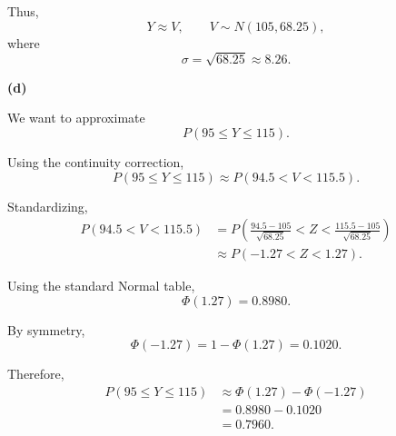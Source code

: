 \documentclass[11pt]{article}
\begin{document}
\begin{solutionbox}
Thus,
\[
Y\approx V,
\qquad
V\sim N(105,68.25),
\]
where
\[
\sigma=\sqrt{68.25}\approx8.26.
\]


\textbf{(d)}

We want to approximate
\[
P(95\leq Y\leq115).
\]

Using the continuity correction,
\[
P(95\leq Y\leq115)
\approx
P(94.5<V<115.5).
\]

Standardizing,
\begin{align*}
P(94.5<V<115.5)
&=
P\left(
\frac{94.5-105}{\sqrt{68.25}}
<
Z
<
\frac{115.5-105}{\sqrt{68.25}}
\right)\\
&\approx
P(-1.27<Z<1.27).
\end{align*}

Using the standard Normal table,
\[
\Phi(1.27)=0.8980.
\]

By symmetry,
\[
\Phi(-1.27)=1-\Phi(1.27)=0.1020.
\]

Therefore,
\begin{align*}
P(95\leq Y\leq115)
&\approx
\Phi(1.27)-\Phi(-1.27)\\
&=
0.8980-0.1020\\
&=
 {0.7960}.
\end{align*}

 

\end{solutionbox}
\end{document}
